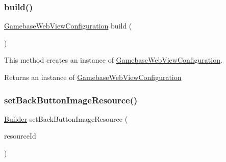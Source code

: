 \subsubsection{\texorpdfstring{build()}{build()}}
{\footnotesize\ttfamily \hyperlink{classcom_1_1toast_1_1android_1_1gamebase_1_1_gamebase_web_view_configuration}{Gamebase\+Web\+View\+Configuration} build (\begin{DoxyParamCaption}{ }\end{DoxyParamCaption})}



This method creates an instance of \hyperlink{classcom_1_1toast_1_1android_1_1gamebase_1_1_gamebase_web_view_configuration}{Gamebase\+Web\+View\+Configuration}. 

\begin{DoxyReturn}{Returns}
an instance of \hyperlink{classcom_1_1toast_1_1android_1_1gamebase_1_1_gamebase_web_view_configuration}{Gamebase\+Web\+View\+Configuration} 
\end{DoxyReturn}
\mbox{\label{classcom_1_1toast_1_1android_1_1gamebase_1_1_gamebase_web_view_configuration_1_1_builder_a9c364e3b1f41dfe4acc8ace444490168}} 
\subsubsection{\texorpdfstring{set\+Back\+Button\+Image\+Resource()}{setBackButtonImageResource()}\hspace{0.1cm}{\footnotesize\ttfamily [1/2]}}
{\footnotesize\ttfamily \hyperlink{classcom_1_1toast_1_1android_1_1gamebase_1_1_gamebase_web_view_configuration_1_1_builder}{Builder} set\+Back\+Button\+Image\+Resource (\begin{DoxyParamCaption}\item[{@Drawable\+Res int}]{resource\+Id }\end{DoxyParamCaption})}



